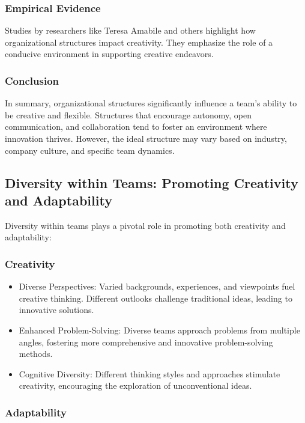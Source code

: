 \documentclass[a4paper, twoside]{article}
\begin{document}
\subsubsection{Empirical Evidence}

Studies by researchers like Teresa Amabile and others highlight how organizational structures impact creativity. They emphasize the role of a conducive environment in supporting creative endeavors.


\subsubsection{Conclusion}
In summary, organizational structures significantly influence a team's ability to be creative and flexible. Structures that encourage autonomy, open communication, and collaboration tend to foster an environment where innovation thrives. However, the ideal structure may vary based on industry, company culture, and specific team dynamics.


\newpage
\subsection{Diversity within Teams: Promoting Creativity and Adaptability}

Diversity within teams plays a pivotal role in promoting both creativity and adaptability:

\subsubsection{Creativity}

\begin{itemize}
    \item{Diverse Perspectives:} Varied backgrounds, experiences, and viewpoints fuel creative thinking. Different outlooks challenge traditional ideas, leading to innovative solutions.
    
    \item{Enhanced Problem-Solving:} Diverse teams approach problems from multiple angles, fostering more comprehensive and innovative problem-solving methods.
    
    \item{Cognitive Diversity:} Different thinking styles and approaches stimulate creativity, encouraging the exploration of unconventional ideas.
\end{itemize}

\subsubsection{Adaptability}
\end{document}
